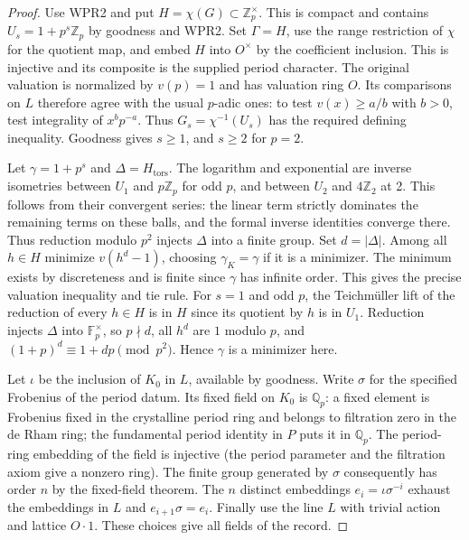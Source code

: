 \begin{proof}
Use WPR2 and put $H=\chi(G)\subset\mathbb Z_p^\times$. This is compact
and contains $U_s=1+p^s\mathbb Z_p$ by goodness and WPR2. Set
$\Gamma=H$, use the range restriction of $\chi$ for the quotient map,
and embed $H$ into $O^\times$ by the coefficient inclusion. This is
injective and its composite is the supplied period character. The
original valuation is normalized by $v(p)=1$ and has valuation ring
$O$. Its comparisons on $L$ therefore agree with the usual
$p$-adic ones: to test $v(x)\ge a/b$ with $b>0$, test integrality
of $x^bp^{-a}$. Thus $G_s=\chi^{-1}(U_s)$ has the required defining
inequality. Goodness gives $s\ge1$, and $s\ge2$ for $p=2$.

Let $\gamma=1+p^s$ and $\Delta=H_{\mathrm{tors}}$. The logarithm
and exponential are inverse isometries between $U_1$ and $p\mathbb Z_p$
for odd $p$, and between $U_2$ and $4\mathbb Z_2$ at 2. This follows
from their convergent series: the linear term strictly dominates the
remaining terms on these balls, and the formal inverse identities
converge there. Thus reduction modulo $p^2$ injects $\Delta$ into a
finite group. Set $d=|\Delta|$. Among all $h\in H$ minimize
$v(h^d-1)$, choosing $\gamma_K=\gamma$ if it is a minimizer.
The minimum exists by discreteness and is finite since $\gamma$ has
infinite order. This gives the precise valuation inequality and tie
rule. For $s=1$ and odd $p$, the Teichm\"uller lift of the reduction
of every $h\in H$ is in $H$ since its quotient by $h$ is in $U_1$.
Reduction injects $\Delta$ into $\mathbb F_p^\times$, so $p\nmid d$,
all $h^d$ are $1$ modulo $p$, and
$(1+p)^d\equiv1+dp\pmod{p^2}$. Hence $\gamma$ is a minimizer here.

Let $\iota$ be the inclusion of $K_0$ in $L$, available by goodness.
Write $\sigma$ for the specified Frobenius of the period datum. Its
fixed field on $K_0$ is $\mathbb Q_p$: a fixed element is Frobenius
fixed in the crystalline period ring and belongs to filtration zero
in the de Rham ring; the fundamental period identity in $P$ puts it
in $\mathbb Q_p$. The period-ring embedding of the field is injective
(the period parameter and the filtration axiom give a nonzero ring).
The finite group generated by $\sigma$ consequently has order $n$ by
the fixed-field theorem. The $n$ distinct embeddings
$e_i=\iota\sigma^{-i}$ exhaust the embeddings in $L$ and
$e_{i+1}\sigma=e_i$. Finally use the line $L$ with trivial action
and lattice $O\cdot1$. These choices give all fields of the record.
\end{proof}

